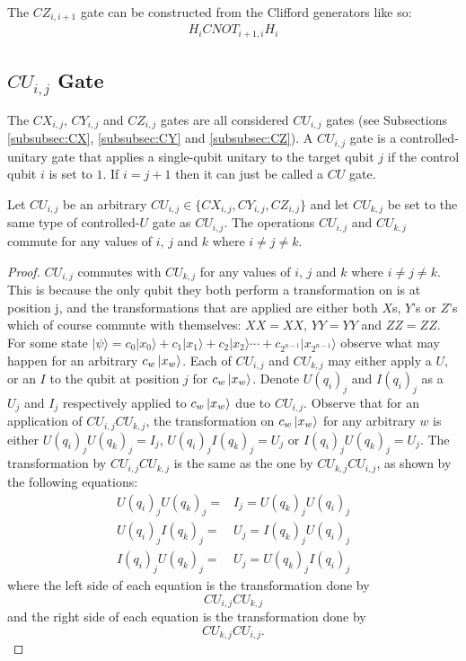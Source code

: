 The $\mathit{CZ}_{i,i+1}$ gate can be constructed from the Clifford generators like so:
\begin{align}
H_{i}\mathit{CNOT}_{i+1,i}H_{i}
\end{align}

\subsection{\texorpdfstring{$\mathit{CU}_{i,j}$}{ i,j} Gate}
\label{subsubsec:CU}
The $\mathit{CX}_{i,j}$, $\mathit{CY}_{i,j}$ and $\mathit{CZ}_{i,j}$ gates are all considered $\mathit{CU}_{i,j}$ gates (see Subsections \ref{subsubsec:CX}, \ref{subsubsec:CY} and \ref{subsubsec:CZ}). A $\mathit{CU}_{i,j}$ gate is a controlled-unitary gate that applies a single-qubit unitary to the target qubit $j$ if the control qubit $i$ is set to $1$. If $i = j + 1$ then it can just be called a $\mathit{CU}$ gate.

\begin{theorem}
\label{theorem:CUsCommute}
Let $\mathit{CU}_{i,j}$ be an arbitrary $\mathit{CU}_{i,j} \in \{\mathit{CX}_{i,j}, \mathit{CY}_{i,j}, \mathit{CZ}_{i,j}\}$ and let $\mathit{CU}_{k,j}$ be set to the same type of controlled-$U$ gate as $\mathit{CU}_{i,j}$. The operations $\mathit{CU}_{i,j}$ and $\mathit{CU}_{k,j}$ commute for any values of $i$, $j$ and $k$ where $i \neq j \neq k$.
\end{theorem}
\begin{proof}
$\mathit{CU}_{i,j}$ commutes with $\mathit{CU}_{k,j}$ for any values of $i$, $j$ and $k$ where $i \neq j \neq k$. This is because the only qubit they both perform a transformation on is at position j, and the transformations that are applied are either both $X$s, $Y$'s or $Z$'s which of course commute with themselves: $XX = XX$, $YY = YY$ and $ZZ = ZZ$. For some state $|\psi\rangle = c_0|x_0\rangle + c_1|x_1\rangle + c_2|x_2\rangle \cdots + c_{2^{n-1}}|x_{2^{n-1}}\rangle$ observe what may happen for an arbitrary $c_w\ket{x_w}$. Each of $\mathit{CU}_{i,j}$ and $\mathit{CU}_{k,j}$ may either apply a $U$, or an $I$ to the qubit at position $j$ for $c_w\ket{x_w}$. Denote $U(q_i)_j$ and $I(q_i)_j$ as a $U_j$ and $I_j$ respectively applied to $c_w\ket{x_w}$ due to $\mathit{CU}_{i,j}$. Observe that for an application of $\mathit{CU}_{i,j}\mathit{CU}_{k,j}$, the transformation on $c_w\ket{x_w}$ for any arbitrary $w$ is either $U(q_i)_j U(q_k)_j = I_j$, $U(q_i)_jI(q_k)_j = U_j$ or $I(q_i)_jU(q_k)_j = U_j$. The transformation by $\mathit{CU}_{i,j}\mathit{CU}_{k,j}$ is the same as the one by $\mathit{CU}_{k,j}\mathit{CU}_{i,j}$, as shown by the following equations:
\begin{align}
U(q_i)_j U(q_k)_j = &I_j = U(q_k)_j U(q_i)_j\\
U(q_i)_jI(q_k)_j = &U_j = I(q_k)_jU(q_i)_j\\
I(q_i)_jU(q_k)_j = &U_j = U(q_k)_jI(q_i)_j
\end{align}
where the left side of each equation is the transformation done by $$\mathit{CU}_{i,j}\mathit{CU}_{k,j}$$ and the right side of each equation is the transformation done by $$\mathit{CU}_{k,j}\mathit{CU}_{i,j}.$$
\end{proof}

